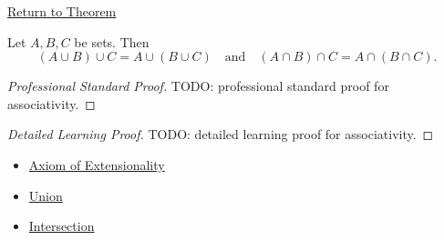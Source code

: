 \newpage
{}
\label{prf:associativity}

\begin{remark*}[Return]
\hyperref[thm:associativity]{Return to Theorem}
\end{remark*}

\begin{theorem*}
Let $A,B,C$ be sets. Then
\[
(A \cup B) \cup C = A \cup (B \cup C)
\quad\text{and}\quad
(A \cap B) \cap C = A \cap (B \cap C).
\]
\end{theorem*}

\begin{proof}[Professional Standard Proof]
\LRAProofBodyStart
TODO: professional standard proof for associativity.
\end{proof}

\begin{proof}[Detailed Learning Proof]
\LRAProofBodyStart
TODO: detailed learning proof for associativity.
\end{proof}

\begin{remark*}
\end{remark*}

\begin{dependencies}
\begin{itemize}
  \item \hyperref[ax:extensionality]{Axiom of Extensionality}
  \item \hyperref[def:union]{Union}
  \item \hyperref[def:intersection]{Intersection}
\end{itemize}
\end{dependencies}

\clearpage
